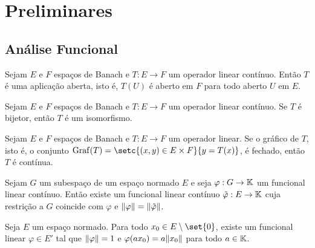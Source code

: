\documentclass[../dissertacao]{subfiles}
\begin{document}
\chapter{Preliminares}

\section{Análise Funcional}

\begin{theorem}\label{thm:aplicacaoaberta}
    Sejam \(E\) e \(F\) espaços de Banach e \(T:E\to F\) um operador linear contínuo. Então \(T\) é uma aplicação aberta, isto é, \(T(U)\)
    é aberto em \(F\) para todo aberto \(U\) em \(E\).
\end{theorem}
\begin{corollary}
    Sejam \(E\) e \(F\) espaços de Banach e \(T:E\to F\) um operador linear contínuo. Se \(T\) é bijetor, então \(T\) é um isomorfismo.
\end{corollary}
\begin{theorem}\label{thm:graficofechado}
    Sejam \(E\) e \(F\) espaços de Banach e \(T:E\to F\) um operador linear. Se o gráfico de \(T\), isto é, o conjunto \(\graf(T)=\setc{(x,y)\in E\times F}{y=T(x)}\), é fechado, então \(T\) é contínua. 
\end{theorem}
\begin{theorem}
    Sejam \(G\) um subespaço de um espaço normado \(E\) e seja \(\varphi:G\to \mathbb{K}\) um funcional linear contínuo. Então existe um funcional linear contínuo \(\tilde{\varphi}:E\to\mathbb{K}\) cuja restrição a \(G\) coincide com \(\varphi\) e \(\lVert\varphi\rVert=\lVert\tilde{\varphi}\rVert\).
\end{theorem}
\begin{corollary}\label{cor:hahnbanachfuncional}
    Seja \(E\) um espaço normado. Para todo \(x_0\in E\setminus\set{0}\), existe um funcional linear \(\varphi\in E'\) tal que \(\lVert\varphi\rVert=1\) e \(\varphi(ax_0)=a\lVert x_0\rVert\) para todo \(a\in\mathbb{K}\).
\end{corollary}
\end{document}
